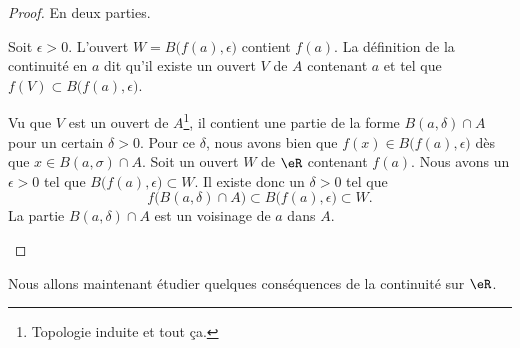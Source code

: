 \begin{proof}
	En deux parties.
	\begin{subproof}
		Soit \( \epsilon>0\). L'ouvert \( W=B\big( f(a),\epsilon \big)\) contient \( f(a)\). La définition de la continuité en \( a\) dit qu'il existe un ouvert \( V\) de \( A\) contenant \( a\) et tel que \( f(V)\subset B\big( f(a),\epsilon \big)\).

		Vu que \( V\) est un ouvert de \( A\)\footnote{Topologie induite et tout ça.}, il contient une partie de la forme \( B(a,\delta)\cap A\) pour un certain \( \delta>0\). Pour ce \( \delta\), nous avons bien  que \(f(x)\in B\big( f(a), \epsilon \big) \) dès que \( x\in B(a,\sigma)\cap A\).
		Soit un ouvert \( W\) de \( \eR\) contenant \( f(a)\). Nous avons un \( \epsilon>0\) tel que \( B\big( f(a),\epsilon \big)\subset W\). Il existe donc un \( \delta>0\) tel que
		\begin{equation}
			f\big( B(a,\delta)\cap A \big)\subset B\big( f(a),\epsilon \big)\subset W.
		\end{equation}
		La partie \( B(a,\delta)\cap A\) est un voisinage de \( a\) dans \( A\).
	\end{subproof}
\end{proof}

Nous allons maintenant étudier quelques conséquences de la continuité sur \( \eR\).

